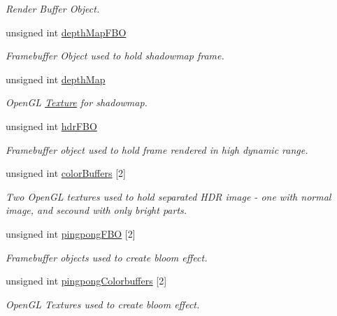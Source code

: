 \begin{DoxyCompactItemize}
\begin{DoxyCompactList}\small\item\em Render Buffer Object. \end{DoxyCompactList}\item 
unsigned int \mbox{\hyperlink{class_game_aab4586c4a7c0240977381b22808ebfa6}{depth\+Map\+F\+BO}}
\begin{DoxyCompactList}\small\item\em Framebuffer Object used to hold shadowmap frame. \end{DoxyCompactList}\item 
unsigned int \mbox{\hyperlink{class_game_a61853261d678bcfe2638deba1e58fd18}{depth\+Map}}
\begin{DoxyCompactList}\small\item\em Open\+GL \mbox{\hyperlink{class_texture}{Texture}} for shadowmap. \end{DoxyCompactList}\item 
unsigned int \mbox{\hyperlink{class_game_aecf2b0705e36b7b510be741add10f974}{hdr\+F\+BO}}
\begin{DoxyCompactList}\small\item\em Framebuffer object used to hold frame rendered in high dynamic range. \end{DoxyCompactList}\item 
unsigned int \mbox{\hyperlink{class_game_af6b4374237efc5ae2586dd1b2a0304f3}{color\+Buffers}} \mbox{[}2\mbox{]}
\begin{DoxyCompactList}\small\item\em Two Open\+GL textures used to hold separated H\+DR image -\/ one with normal image, and secound with only bright parts. \end{DoxyCompactList}\item 
unsigned int \mbox{\hyperlink{class_game_a0160418629f882b089847e9ddd6901f5}{pingpong\+F\+BO}} \mbox{[}2\mbox{]}
\begin{DoxyCompactList}\small\item\em Framebuffer objects used to create bloom effect. \end{DoxyCompactList}\item 
unsigned int \mbox{\hyperlink{class_game_abbb66ef5bda6124f03272970cd18707f}{pingpong\+Colorbuffers}} \mbox{[}2\mbox{]}
\begin{DoxyCompactList}\small\item\em Open\+GL Textures used to create bloom effect. \end{DoxyCompactList}\item 

\end{DoxyCompactItemize}
